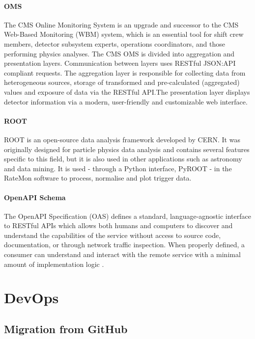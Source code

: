 \paragraph{OMS} The CMS Online Monitoring System \cite{Andre2649402} is an upgrade and successor to the CMS Web-Based Monitoring (WBM) system, which is an essential tool for shift crew members, detector subsystem experts, operations coordinators, and those performing physics analyses. The CMS OMS is divided into aggregation and presentation layers. Communication between layers uses RESTful JSON:API compliant requests. The aggregation layer is responsible for collecting data from heterogeneous sources, storage of transformed and pre-calculated (aggregated) values and exposure of data via the RESTful API.The presentation layer displays detector information via a modern, user-friendly and customizable web interface.

\paragraph{ROOT} ROOT \cite{Brun:1997pa} is an open-source data analysis framework developed by CERN. It was originally designed for particle physics data analysis and contains several features specific to this field, but it is also used in other applications such as astronomy and data mining. It is used - through a Python interface, PyROOT \cite{PythoninterfacePyROOTROOT-2020-10-02} - in the RateMon software to process, normalise and plot trigger data.

\paragraph{OpenAPI Schema} The OpenAPI Specification (OAS) defines a standard, language-agnostic interface to RESTful APIs which allows both humans and computers to discover and understand the capabilities of the service without access to source code, documentation, or through network traffic inspection. When properly defined, a consumer can understand and interact with the remote service with a minimal amount of implementation logic \cite{OpenAPISpecificationVersion303Swagger-2020-10-16}.

\section{DevOps}

\subsection{Migration from GitHub}

